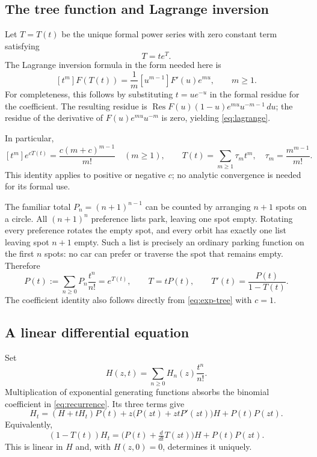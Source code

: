 \documentclass[11pt,letterpaper]{article}
\numberwithin{equation}{section}
\theoremstyle{definition}
\DeclareMathOperator{\Res}{Res}
\begin{document}
\subsection{The tree function and Lagrange inversion}
Let $T=T(t)$ be the unique formal power series with zero constant term
satisfying
\begin{equation}\label{eq:tree}
 T=t e^T.
\end{equation}
The Lagrange inversion formula in the form needed here is
\begin{equation}\label{eq:lagrange}
 [t^m]F(T(t))=\frac1m[u^{m-1}]F'(u)e^{mu},\qquad m\ge1.
\end{equation}
For completeness, this follows by substituting $t=u e^{-u}$ in the formal
residue for the coefficient. The resulting residue is
$\Res F(u)(1-u)e^{mu}u^{-m-1}\,du$; the residue of the derivative of
$F(u)e^{mu}u^{-m}$ is zero, yielding \eqref{eq:lagrange}.

In particular,
\begin{equation}\label{eq:exp-tree}
 [t^m]e^{cT(t)}=\frac{c(m+c)^{m-1}}{m!}\quad(m\ge1),
 \qquad
 T(t)=\sum_{m\ge1}\tau_m t^m,
 \quad \tau_m=\frac{m^{m-1}}{m!}.
\end{equation}
This identity applies to positive or negative $c$; no analytic convergence
is needed for its formal use.

The familiar total $P_n=(n+1)^{n-1}$ can be counted by arranging $n+1$ spots
on a circle. All $(n+1)^n$ preference lists park, leaving one spot empty.
Rotating every preference rotates the empty spot, and every orbit has
exactly one list leaving spot $n+1$ empty. Such a list is precisely an
ordinary parking function on the first $n$ spots: no car can prefer or
traverse the spot that remains empty. Therefore
\begin{equation}\label{eq:P}
 P(t):=\sum_{n\ge0}P_n\frac{t^n}{n!}=e^{T(t)},
 \qquad T=tP(t),\qquad
 T'(t)=\frac{P(t)}{1-T(t)}.
\end{equation}
The coefficient identity also follows directly from \eqref{eq:exp-tree}
with $c=1$.

\subsection{A linear differential equation}
Set
\[
 H(z,t)=\sum_{n\ge0}H_n(z)\frac{t^n}{n!}.
\]
Multiplication of exponential generating functions absorbs the binomial
coefficient in \eqref{eq:recurrence}. Its three terms give
\[
 H_t=(H+tH_t)P(t)
   +z\bigl(P(zt)+ztP'(zt)\bigr)H+P(t)P(zt).
\]
Equivalently,
\begin{equation}\label{eq:ode-t}
 (1-T(t))H_t
 =\bigl(P(t)+\tfrac{d}{dt}T(zt)\bigr)H+P(t)P(zt).
\end{equation}
This is linear in $H$ and, with $H(z,0)=0$, determines it uniquely.
\end{document}
